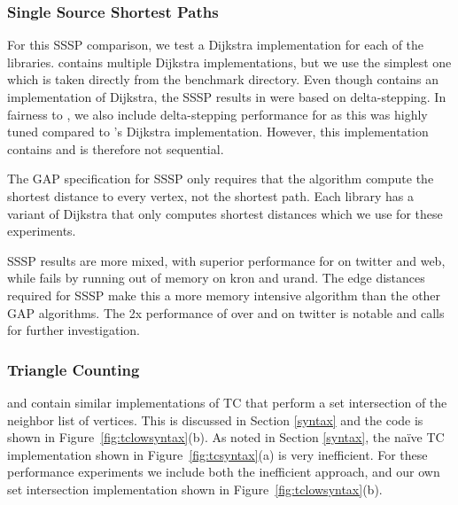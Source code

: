 \subsubsection{Single Source Shortest Paths}

For this SSSP comparison, we test a Dijkstra implementation for each of the libraries.
\nwgraph contains multiple Dijkstra implementations, but we use the simplest one which
is taken directly from the \nwgraph benchmark directory.
Even though \nwgraph contains an implementation of Dijkstra,
the SSSP results in \cite{REF_nwgraph_paper} were based on delta-stepping.
In fairness to \nwgraph, we also include delta-stepping performance for \nwgraph 
as this was highly tuned compared to \nwgraph's Dijkstra implementation.
However, this implementation contains  and is therefore not sequential.

The GAP specification for SSSP only requires that the algorithm compute the shortest distance
to every vertex, not the shortest path.
Each library has a variant of Dijkstra that only computes shortest distances which we use for these experiments.

SSSP results are more mixed, with superior performance for \bgl on twitter and web,
while \bgl fails by running out of memory on kron and urand.
The edge distances required for SSSP make this a more memory intensive algorithm
than the other GAP algorithms.
The 2x performance of \bgl over \nwgraph and \stdgraph on twitter is notable and calls for further
investigation.

\subsubsection{Triangle Counting}

\nwgraph and \stdgraph contain similar implementations of TC 
that perform a set intersection of the neighbor list of vertices.
This is discussed in Section \ref{syntax} and the \stdgraph code is shown
in Figure~\ref{fig:tclowsyntax}(b).
As noted in Section \ref{syntax}, the na\"ive \bgl TC implementation shown in Figure~\ref{fig:tcsyntax}(a) is very inefficient.
For these performance experiments we include both the inefficient \bgl approach, and our own
\bgl set intersection implementation shown in Figure~\ref{fig:tclowsyntax}(b).

